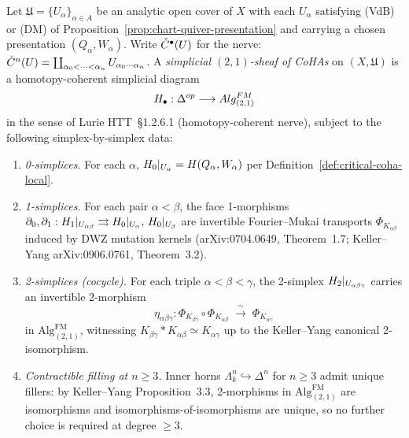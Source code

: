 \begin{definition}
\label{def:simplicial-sheaf-cohas}
\ClaimStatusDefinition
Let $\mathfrak{U} = \{U_\alpha\}_{\alpha \in A}$ be an analytic
open cover of $X$ with each $U_\alpha$ satisfying (VdB) or (DM) of
Proposition~\ref{prop:chart-quiver-presentation} and carrying a
chosen presentation $(Q_\alpha, W_\alpha)$. Write
$\check{C}^\bullet(U)$ for the nerve:
$\check{C}^n(U) = \coprod_{\alpha_0 < \cdots < \alpha_n}
U_{\alpha_0 \cdots \alpha_n}$. A \emph{simplicial $(2,1)$-sheaf of
CoHAs} on $(X, \mathfrak{U})$ is a homotopy-coherent simplicial
diagram
\[
  H_\bullet: \Delta^{op} \longrightarrow
  Alg^{FM}_{(2,1)}
\]
in the sense of Lurie HTT~\S1.2.6.1 (homotopy-coherent nerve),
subject to the following simplex-by-simplex data:
\begin{enumerate}
\item[(S1)] \emph{0-simplices.} For each $\alpha$,
  $H_0|_{U_\alpha} = H(Q_\alpha, W_\alpha)$ per
  Definition~\ref{def:critical-coha-local}.
\item[(S2)] \emph{1-simplices.} For each pair $\alpha < \beta$,
  the face 1-morphisms
  $\partial_0, \partial_1: H_1|_{U_{\alpha\beta}}
  \rightrightarrows H_0|_{U_\alpha},\, H_0|_{U_\beta}$ are
  invertible Fourier--Mukai transports $\Phi_{K_{\alpha\beta}}$
  induced by DWZ mutation kernels (arXiv:0704.0649, Theorem~1.7;
  Keller--Yang arXiv:0906.0761, Theorem~3.2).
\item[(S3)] \emph{2-simplices (cocycle).} For each triple
  $\alpha < \beta < \gamma$, the 2-simplex
  $H_2|_{U_{\alpha\beta\gamma}}$ carries an invertible 2-morphism
  \[
    \eta_{\alpha\beta\gamma}:
    \Phi_{K_{\beta\gamma}} \circ \Phi_{K_{\alpha\beta}}
    \;\xrightarrow{\;\sim\;}\;
    \Phi_{K_{\alpha\gamma}}
  \]
  in $\mathrm{Alg}^{\mathrm{FM}}_{(2,1)}$, witnessing
  $K_{\beta\gamma} \ast K_{\alpha\beta} \simeq K_{\alpha\gamma}$ up
  to the Keller--Yang canonical 2-isomorphism.
\item[(S4)] \emph{Contractible filling at $n \geq 3$.} Inner horns
  $\Lambda^n_k \hookrightarrow \Delta^n$ for $n \geq 3$ admit unique
  fillers: by Keller--Yang Proposition~3.3, 2-morphisms in
  $\mathrm{Alg}^{\mathrm{FM}}_{(2,1)}$ are isomorphisms and
  isomorphisms-of-isomorphisms are unique, so no further choice is
  required at degree $\geq 3$.
\end{enumerate}
\end{definition}

